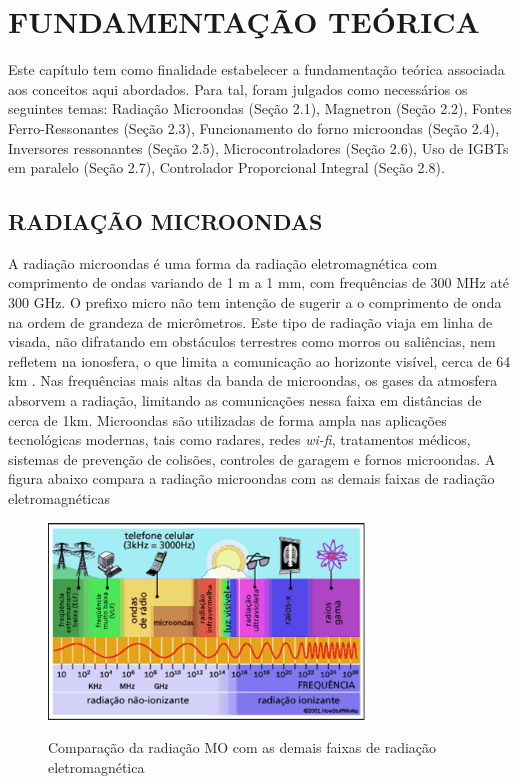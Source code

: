 
\chapter{FUNDAMENTAÇÃO TEÓRICA}
\label{chap:fundamentacaoTeorica}

Este capítulo tem como finalidade estabelecer a fundamentação teórica associada aos conceitos aqui abordados. Para tal, foram julgados como necessários os seguintes temas: Radiação Microondas (Seção 2.1), Magnetron (Seção 2.2), Fontes Ferro-Ressonantes (Seção 2.3), Funcionamento do forno microondas (Seção 2.4), Inversores ressonantes (Seção 2.5), Microcontroladores (Seção 2.6), Uso de IGBTs em paralelo (Seção 2.7), Controlador Proporcional Integral (Seção 2.8).

\section{RADIAÇÃO MICROONDAS}
\label{sec:radiacaoMicroondas}

A radiação microondas é uma forma da radiação eletromagnética com comprimento de ondas variando de 1 m a 1 mm, com frequências de 300 MHz até 300 GHz. O prefixo micro não tem intenção de sugerir a o comprimento de onda na ordem de grandeza de micrômetros. Este tipo de radiação viaja em linha de visada, não difratando em obstáculos terrestres como morros ou saliências, nem refletem na ionosfera, o que limita a comunicação ao horizonte visível, cerca de 64 km \cite{hitchcock}. Nas frequências mais altas da banda de microondas, os gases da atmosfera absorvem a radiação, limitando as comunicações nessa faixa em distâncias de cerca de 1km. Microondas são utilizadas de forma ampla nas aplicações tecnológicas modernas, tais como radares, redes \textit{wi-fi}, tratamentos médicos, sistemas de prevenção de colisões, controles de garagem e fornos microondas. A figura abaixo compara a radiação microondas com as demais faixas de radiação eletromagnéticas

\begin{figure}[!htb]
    \centering
    \caption{Comparação da radiação MO com as demais faixas de radiação eletromagnética}
    \includegraphics[width=0.75\textwidth]{./dados/figuras/figura_microondas}
    \label{fig:figura-mo}
\end{figure}

